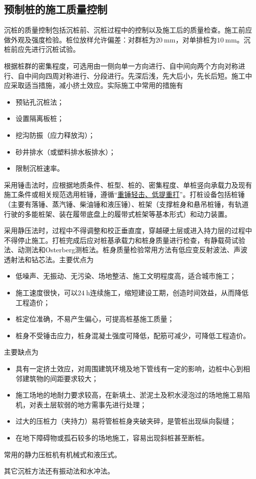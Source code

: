 \documentclass{book}
\begin{document}
\subsection{预制桩的施工质量控制}
\par 沉桩的质量控制包括沉桩前、沉桩过程中的控制以及施工后的质量检查。施工前应做外观及强度检验。桩位放样允许偏差：对群桩为$\SI{20}{\mm}$，对单排桩为$\SI{10}{\mm}$。沉桩前应先进行沉桩试验。
\par 根据桩群的密集程度，可选用由一侧向单一方向进行、自中间向两个方向对称进行、自中间向四周对称进行、分段进行。先深后浅，先大后小，先长后短。施工中应采取适当措施，减小挤土效应。实际施工中常用的措施有
\begin{itemize}
    \item 预钻孔沉桩法；
    \item 设置隔离板桩；
    \item 挖沟防振（应力释放沟）；
    \item 砂井排水（或塑料排水板排水）；
    \item 限制沉桩速率。
\end{itemize}
\par 采用锤击法时，应根据地质条件、桩型、桩的、密集程度、单桩竖向承载力及现有施工条件或相关规范选用桩锤，遵循“\uline{重锤轻击、低提重打}”。打桩设备包括桩锤（主要有落锤、蒸汽锤、柴油锤和液压锤）、桩架（支撑桩身和悬吊桩锤，有轨道行驶的多能桩架、装在履带底盘上的履带式桩架等基本形式）和动力装置。
\par 采用静压法时，过程中不得调整和校正垂直度，穿越硬土层或进入持力层的过程中不得停止施工。打桩完成后应对桩基承载力和桩身质量进行检查，有静载荷试验法、动测法和Osterberg测桩法。桩身质量检验常用方法有低应变反射波法、声波透射法和钻芯法。主要优点为\begin{itemize}
    \item 低噪声、无振动、无污染、场地整洁、施工文明程度高，适合城市施工；
    \item 施工速度很快，可以$\SI{24}{\hour}$连续施工，缩短建设工期，创造时间效益，从而降低工程造价；
    \item 桩定位准确，不易产生偏心，可提高桩基施工质量；
    \item 桩身不受锤击应力，桩身混凝土强度可降低，配筋可减少，可降低工程造价。
\end{itemize}
\par 主要缺点为\begin{itemize}
    \item 具有一定挤土效应，对周围建筑环境及地下管线有一定的影响，边桩中心到相邻建筑物的间距要求较大；
    \item 施工场地的地耐力要求较高，在新填土、淤泥土及积水浸泡过的场地施工易陷机，对表土层软弱的地方需事先进行处理；
    \item 过大的压桩力（夹持力）易将管桩桩身夹破夹碎，是管桩出现纵向裂缝；
    \item 在地下障碍物或孤石较多的场地施工，容易出现斜桩甚至断桩。
\end{itemize}
\par 常用的静力压桩机有机械式和液压式。
\par 其它沉桩方法还有振动法和水冲法。
\end{document}
